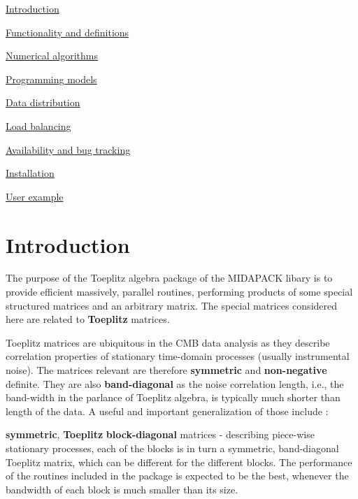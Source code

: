 
\begin{DoxyItemize}
\item \hyperlink{toeplitz_intro}{Introduction}
\item \hyperlink{toeplitz_functionality}{Functionality and definitions}
\item \hyperlink{toeplitz_algo}{Numerical algorithms}
\item \hyperlink{toeplitz_progmodels}{Programming models}
\item \hyperlink{toeplitz_datadistr}{Data distribution}
\item \hyperlink{toeplitz_loadbalancing}{Load balancing}
\item \hyperlink{toeplitz_avail}{Availability and bug tracking}
\item \hyperlink{toeplitz_install}{Installation}
\item \hyperlink{toeplitz_example}{User example} 
\end{DoxyItemize}\hypertarget{toeplitz_intro}{}\section{Introduction}\label{toeplitz_intro}
The purpose of the Toeplitz algebra package of the M\-I\-D\-A\-P\-A\-C\-K libary is to provide efficient massively, parallel routines, performing products of some special structured matrices and an arbitrary matrix. The special matrices considered here are related to {\bfseries Toeplitz} matrices.

Toeplitz matrices are ubiquitous in the C\-M\-B data analysis as they describe correlation properties of stationary time-\/domain processes (usually instrumental noise). The matrices relevant are therefore {\bfseries symmetric} and {\bfseries non-\/negative} definite. They are also {\bfseries band-\/diagonal} as the noise correlation length, i.\-e., the band-\/width in the parlance of Toeplitz algebra, is typically much shorter than length of the data. A useful and important generalization of those include \-:
\begin{DoxyItemize}
\item {\bfseries symmetric}, {\bfseries Toeplitz} {\bfseries block-\/diagonal} matrices -\/ describing piece-\/wise stationary processes, each of the blocks is in turn a symmetric, band-\/diagonal Toeplitz matrix, which can be different for the different blocks. The performance of the routines included in the package is expected to be the best, whenever the bandwidth of each block is much smaller than its size.
\end{DoxyItemize}


